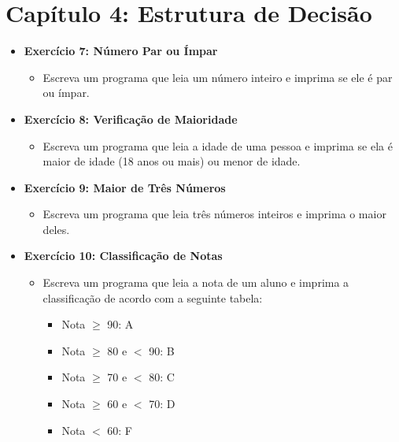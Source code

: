 \documentclass{article}
\begin{document}
\section*{Capítulo 4: Estrutura de Decisão}
\begin{itemize}
    \item \textbf{Exercício 7: Número Par ou Ímpar}
    \begin{itemize}
        \item Escreva um programa que leia um número inteiro e imprima se ele é par ou ímpar.
    \end{itemize}
    \item \textbf{Exercício 8: Verificação de Maioridade}
    \begin{itemize}
        \item Escreva um programa que leia a idade de uma pessoa e imprima se ela é maior de idade (18 anos ou mais) ou menor de idade.
    \end{itemize}
    \item \textbf{Exercício 9: Maior de Três Números}
    \begin{itemize}
        \item Escreva um programa que leia três números inteiros e imprima o maior deles.
    \end{itemize}
    \item \textbf{Exercício 10: Classificação de Notas}
    \begin{itemize}
        \item Escreva um programa que leia a nota de um aluno e imprima a classificação de acordo com a seguinte tabela:
        \begin{itemize}
            \item Nota \(\geq\) 90: A
            \item Nota \(\geq\) 80 e $<$ 90: B
            \item Nota \(\geq\) 70 e $<$ 80: C
            \item Nota \(\geq\) 60 e $<$ 70: D
            \item Nota $<$ 60: F
        \end{itemize}
    \end{itemize}
\end{itemize}
\end{document}
